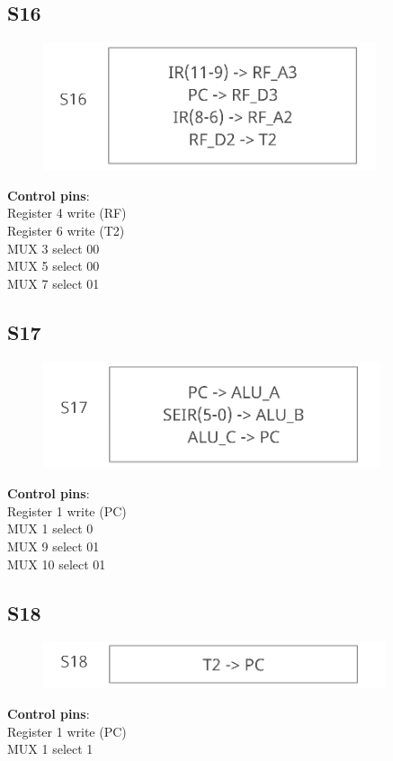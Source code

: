 \documentclass[11pt, fleqn]{article}
\begin{document}
\subsection*{S16}
\begin{figure}[H]
    \centering
    \includegraphics{DataPath/DataPath_S16.PNG}
\end{figure}
\textbf{Control pins}: \\
Register 4 write (RF) \\
Register 6 write (T2) \\
MUX 3 select 00 \\
MUX 5 select 00 \\
MUX 7 select 01 \\

\subsection*{S17}
\begin{figure}[H]
    \centering
    \includegraphics{DataPath/DataPath_S17.PNG}
\end{figure}
\textbf{Control pins}: \\
Register 1 write (PC) \\
MUX 1 select 0 \\
MUX 9 select 01 \\
MUX 10 select 01 \\

\subsection*{S18}
\begin{figure}[H]
    \centering
    \includegraphics{DataPath/DataPath_S18.PNG}
\end{figure}
\textbf{Control pins}: \\
Register 1 write (PC) \\
MUX 1 select 1 \\
\end{document}
